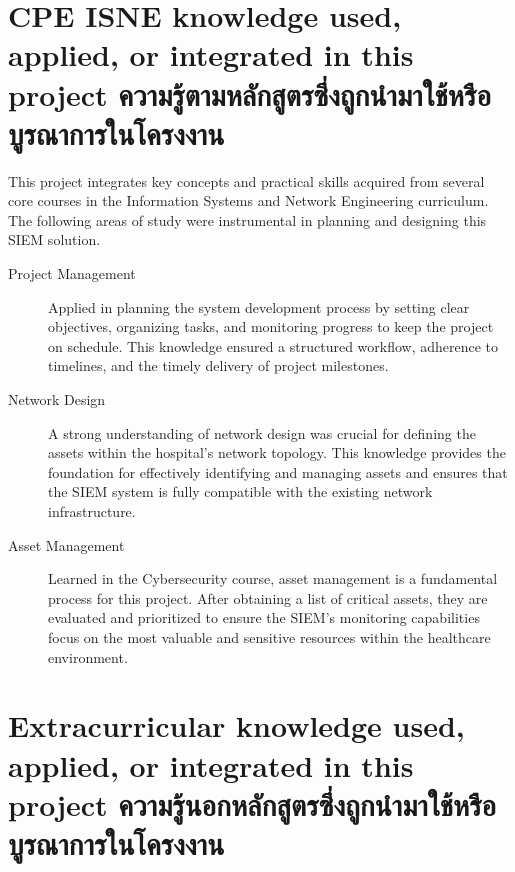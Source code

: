 
\section{\ifenglish%
\ifcpe CPE \else ISNE \fi knowledge used, applied, or integrated in this project
\else%
ความรู้ตามหลักสูตรซึ่งถูกนำมาใช้หรือบูรณาการในโครงงาน
\fi
}

\label{sec:coursework-integration}

This project integrates key concepts and practical skills acquired from several core courses in the Information Systems and Network Engineering curriculum. The following areas of study were instrumental in planning and designing this SIEM solution.

\begin{description}
    \item[Project Management] Applied in planning the system development process by setting clear objectives, organizing tasks, and monitoring progress to keep the project on schedule. This knowledge ensured a structured workflow, adherence to timelines, and the timely delivery of project milestones.

    \item[Network Design] A strong understanding of network design was crucial for defining the assets within the hospital's network topology. This knowledge provides the foundation for effectively identifying and managing assets and ensures that the SIEM system is fully compatible with the existing network infrastructure.

    \item[Asset Management] Learned in the Cybersecurity course, asset management is a fundamental process for this project. After obtaining a list of critical assets, they are evaluated and prioritized to ensure the SIEM's monitoring capabilities focus on the most valuable and sensitive resources within the healthcare environment.
    
\end{description}
\newpage
\section{\ifenglish%
Extracurricular knowledge used, applied, or integrated in this project
\else%
ความรู้นอกหลักสูตรซึ่งถูกนำมาใช้หรือบูรณาการในโครงงาน
\fi
}

